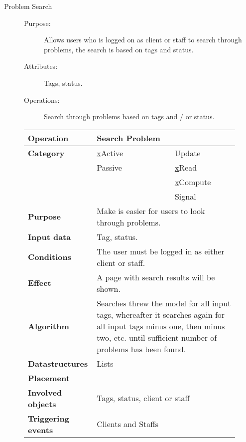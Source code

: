 \begin{description}
\item[Problem Search]\hfill
\begin{description}
\item[Purpose:]Allows users who is logged on as client or staff to search through problems, the search is based on tags and status.
\item[Attributes:]Tags, status.
\item[Operations:]Search through problems based on tags and / or status.
\end{description}
\end{description}

\begin{figure}
\begin{tabular}{p{3.5cm} p{4cm} p{4cm}}
\hline
\textbf{Operation}&Search Problem\\
\hline
\textbf{Category}&\underline{x}Active&\underline{ }Update\\
&\underline{ }Passive&\underline{x}Read\\
&&\underline{x}Compute\\
&&\underline{ }Signal\\
\textbf{Purpose}&\multicolumn{2}{p{8cm}}{Make is easier for users to look through problems.}\\
\textbf{Input data}&\multicolumn{2}{p{8cm}}{Tag, status.}\\
\textbf{Conditions}&\multicolumn{2}{p{8cm}}{The user must be logged in as either client or staff.}\\
\textbf{Effect}&\multicolumn{2}{p{8cm}}{A page with search results will be shown.}\\
\textbf{Algorithm}&\multicolumn{2}{p{8cm}}{Searches threw the model for all input tags, whereafter it searches again for all input tags minus one, then minus two, etc. until sufficient number of problems has been found.}\\
\textbf{Datastructures}&\multicolumn{2}{p{8cm}}{Lists}\\
\textbf{Placement}&\multicolumn{2}{p{8cm}}{}\\
\textbf{Involved objects}&\multicolumn{2}{p{8cm}}{Tags, status, client or staff}\\
\textbf{Triggering events}&\multicolumn{2}{p{8cm}}{Clients and Staffs}\\
\hline
\end{tabular}
\end{figure}

